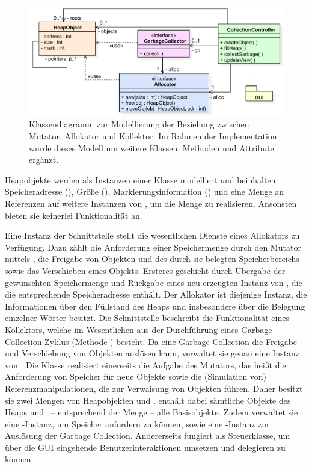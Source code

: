 \begin{figure}[h]
	\centering
	\includegraphics[scale=0.6]{img/uml/ch7-model.pdf}
	\caption[Klassendiagramm zur Modellierung von Mutator, Allokator und Kollektor]{Klassendiagramm zur Modellierung der Beziehung zwischen Mutator, Allokator und Kollektor. Im Rahmen der Implementation wurde dieses Modell um weitere Klassen, Methoden und Attribute ergänzt.}
	\label{fig:model}
\end{figure}

Heapobjekte werden als Instanzen einer Klasse  modelliert und beinhalten Speicheradresse (), Größe (), Markierungsinformation () und eine Menge  an Referenzen auf weitere Instanzen von , um die Menge \Pointers zu realisieren.
Ansonsten bieten sie keinerlei Funktionalität an.

Eine Instanz der Schnittstelle  stellt die wesentlichen Dienste eines Allokators zu Verfügung.
Dazu zählt die Anforderung einer Speichermenge durch den Mutator mittels , die Freigabe von Objekten und des durch sie belegten Speicherbereichs sowie das Verschieben eines Objekts.
Ersteres geschieht durch Übergabe der gewünschten Speichermenge und Rückgabe eines neu erzeugten Instanz von , die die entsprechende Speicheradresse enthält.
Der Allokator ist diejenige Instanz, die Informationen über den Füllstand des Heaps und insbesondere über die Belegung einzelner Wörter besitzt.
Die Schnittstelle  beschreibt die Funktionalität eines Kollektors, welche im Wesentlichen aus der Durchführung eines Garbage-Collection-Zyklus (Methode ) besteht.
Da eine Garbage Collection die Freigabe und Verschiebung von Objekten auslösen kann, verwaltet sie genau eine Instanz von .
Die Klasse  realisiert einerseits die Aufgabe des Mutators, das heißt die Anforderung von Speicher für neue Objekte sowie die (Simulation von) Referenzmanipulationen, die zur Verwaisung von Objekten führen.
Daher besitzt sie zwei Mengen von Heapobjekten  und .
 enthält dabei sämtliche Objekte des Heaps und \ -- entsprechend der Menge \Roots -- alle Basisobjekte.
Zudem verwaltet sie eine -Instanz, um Speicher anfordern zu können, sowie eine -Instanz zur Auslösung der Garbage Collection.
Andererseits fungiert  als Steuerklasse, um über die GUI eingehende Benutzerinteraktionen umsetzen und delegieren zu können.

